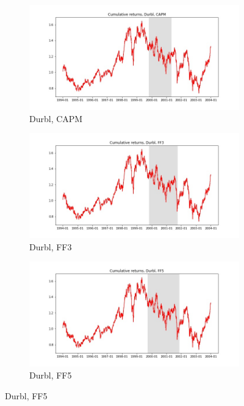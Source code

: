 \documentclass{article}
\begin{document}
\begin{figure}
\centering
  \begin{subfigure}[b]{0.3\textwidth}
    \includegraphics[width=\textwidth]{Durbl/full_cumrets_ofint_CAPM.jpg}
    \caption{Durbl, CAPM}
    \label{fig:1}
  \end{subfigure}
  \begin{subfigure}[b]{0.3\textwidth}
    \includegraphics[width=\textwidth]{Durbl/full_cumrets_ofint_FF3.jpg}
    \caption{Durbl, FF3}
    \label{fig:2}
  \end{subfigure}
   \begin{subfigure}[b]{0.3\textwidth}
    \includegraphics[width=\textwidth]{Durbl/full_cumrets_ofint_FF5.jpg}
    \caption{Durbl, FF5}
    \label{fig:2}
  \end{subfigure}
  \end{figure}
 
\end{document}
